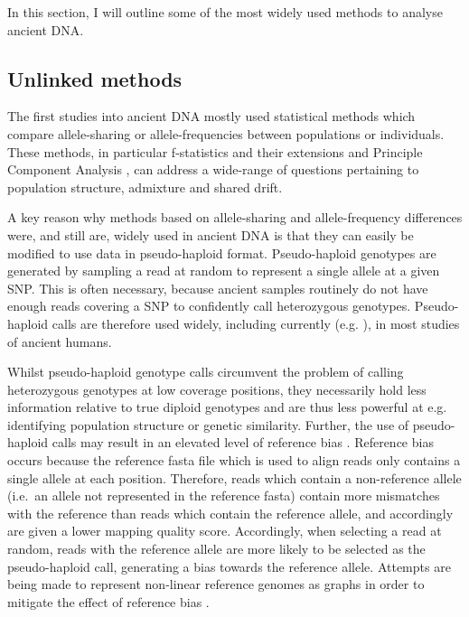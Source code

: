 In this section, I will outline some of the most widely used methods to analyse ancient DNA.

\subsection{Unlinked methods}

The first studies into ancient DNA mostly used statistical methods which compare allele-sharing or allele-frequencies between populations or individuals. These methods, in particular f-statistics and their extensions \cite{Green2010, Patterson2012, peter2016admixture, AssessingqpAdm} and Principle Component Analysis \cite{price2006principal}, can address a wide-range of questions pertaining to population structure, admixture and shared drift. 

A key reason why methods based on allele-sharing and allele-frequency differences were, and still are, widely used in ancient DNA is that they can easily be modified to use data in pseudo-haploid format. Pseudo-haploid genotypes are generated by sampling a read at random to represent a single allele at a given SNP. This is often necessary, because ancient samples routinely do not have enough reads covering a SNP to confidently call heterozygous genotypes. Pseudo-haploid calls are therefore used widely, including currently (e.g. \cite{sirak2021social}), in most studies of ancient humans. 

Whilst pseudo-haploid genotype calls circumvent the problem of calling heterozygous genotypes at low coverage positions, they necessarily hold less information relative to true diploid genotypes and are thus less powerful at e.g. identifying population structure or genetic similarity. Further, the use of pseudo-haploid calls may result in an elevated level of reference bias \cite{GuntherRefBias, Martiniano2017, martiniano2020removing}. Reference bias occurs because the reference fasta file which is used to align reads only contains a single allele at each position. Therefore, reads which contain a non-reference allele (i.e.\ an allele not represented in the reference fasta) contain more mismatches with the reference than reads which contain the reference allele, and accordingly are given a lower mapping quality score. Accordingly, when selecting a read at random, reads with the reference allele are more likely to be selected as the pseudo-haploid call, generating a bias towards the reference allele. Attempts are being made to represent non-linear reference genomes as graphs in order to mitigate the effect of reference bias \cite{Garrison2018, martiniano2020removing}.

